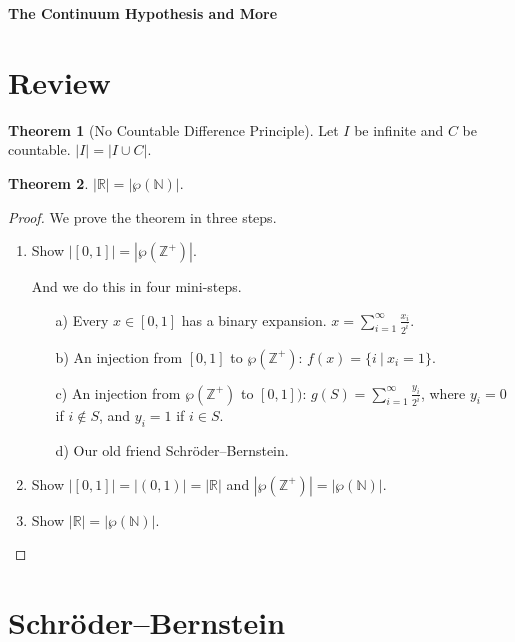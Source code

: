 \documentclass[12pt]{article}
\theoremstyle{definition}
\newtheorem{theorem}{Theorem}[section]
\begin{document}




\begin{center}
{\Large \bf The Continuum Hypothesis and More}
\end{center}

\smallskip

\section{Review}

\begin{theorem}
 [No Countable Difference Principle]
Let $I$ be infinite and $C$ be countable. $|I| = |I \cup C|$.
\end{theorem}

\begin{theorem}
$|\mathbb{R}|=|\wp (\mathbb{N})|$.
\end{theorem}

\begin{proof}
We prove the theorem in three steps.
\begin{enumerate} [leftmargin=2.5cm]
\item Show $|[0,1]|=|\wp (\mathbb{Z}^+)|$.

And we do this in four mini-steps.
\begin{enumerate}
\item[a)] Every $x \in [0,1]$ has a binary expansion. $x = \sum^{\infty}_{i=1} \frac{x_i}{2^i}$.
\item [b)] An injection from $[0,1]$ to $\wp(\mathbb{Z}^+)$: $f(x)=\lbrace i \: \vert \: x_i =1\rbrace$.
\item [c)] An injection from $\wp(\mathbb{Z}^+)$ to $[0,1])$: $g(S) = \sum^{\infty}_{i=1} \frac{y_i}{2^i}$, where $y_i=0$ if $i \notin S$, and $y_i=1$ if $i \in S$.
\item [d)] Our old friend Schr\"{o}der–Bernstein.
\end{enumerate}
\item Show $|[0,1]| = |(0,1)| = |\mathbb{R}|$ and $|\wp (\mathbb{Z}^+)| = |\wp (\mathbb{N})|$.
\item Show $|\mathbb{R}|=|\wp (\mathbb{N})|$.
\end{enumerate}
\end{proof}

\section{Schr\"{o}der–Bernstein}
\end{document}

